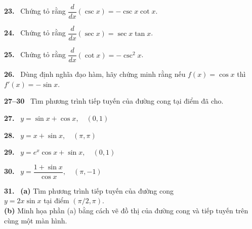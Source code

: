 \noindent
\begin{minipage}[t]{0.485\textwidth}
\raggedright

\textbf{23.} \ Chứng tỏ rằng $\dfrac{d}{dx}(\csc x) = -\csc x \cot x$.\par\vspace{2.5mm}

\textbf{24.} \ Chứng tỏ rằng $\dfrac{d}{dx}(\sec x) = \sec x \tan x$.\par\vspace{2.5mm}

\textbf{25.} \ Chứng tỏ rằng $\dfrac{d}{dx}(\cot x) = -\csc^2 x$.\par\vspace{2.5mm}

\textbf{26.} \ Dùng định nghĩa đạo hàm, hãy chứng minh rằng nếu $f(x) = \cos x$ thì $f'(x) = -\sin x$.\par\vspace{2.8mm}

{\color{stewartcyan}\textbf{27--30}} \ Tìm phương trình tiếp tuyến của đường cong tại điểm đã cho.\par\vspace{2mm}

\textbf{27.} \ $y = \sin x + \cos x, \quad (0, 1)$\par\vspace{2mm}

\textbf{28.} \ $y = x + \sin x, \quad (\pi, \pi)$\par\vspace{2mm}

\textbf{29.} \ $y = e^x \cos x + \sin x, \quad (0, 1)$\par\vspace{2mm}

\textbf{30.} \ $y = \dfrac{1 + \sin x}{\cos x}, \quad (\pi, -1)$\par\vspace{3.5mm}

\textbf{31.} \ \textbf{(a)} Tìm phương trình tiếp tuyến của đường cong\\
\hspace*{5.5mm}$y = 2x \sin x$ tại điểm $(\pi/2, \pi)$.\\[1.2mm]
\llap{\casicon\hspace{1.5mm}}\hspace*{5.5mm}\textbf{(b)} Minh họa phần (a) bằng cách vẽ đồ thị của đường cong và tiếp tuyến trên cùng một màn hình.\par\vspace{2.8mm}


\end{minipage}
